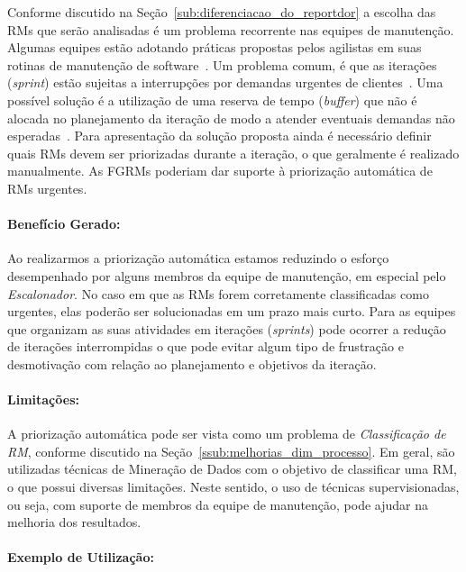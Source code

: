 Conforme discutido na Seção~\ref{sub:diferenciacao_do_reportdor} a escolha das
RMs que serão analisadas é um problema recorrente nas equipes de manutenção.
Algumas equipes estão adotando práticas propostas pelos agilistas em suas
rotinas de manutenção de software~\cite{svensson2005introducing}. Um problema
comum, é que as iterações (\textit{sprint}) estão sujeitas a interrupções por
demandas urgentes de clientes~\cite{bennett2000software}. Uma possível solução
é a utilização de uma reserva de tempo (\textit{buffer}) que não é alocada no
planejamento da iteração de modo a atender eventuais demandas não
esperadas~\cite{schwaber2002agile}. Para apresentação da solução proposta ainda
é necessário definir quais RMs devem ser priorizadas durante a iteração, o que
geralmente é realizado manualmente. As FGRMs poderiam dar suporte à priorização
automática de RMs urgentes.

\paragraph{Benefício Gerado:}\label{par:papéis_afetados_s07}

Ao realizarmos a priorização automática estamos reduzindo o esforço
desempenhado por alguns membros da equipe de manutenção, em especial pelo
\textit{Escalonador}. No caso em que as RMs forem corretamente classificadas
como urgentes, elas poderão ser solucionadas em um prazo mais curto. Para as
equipes que organizam as suas atividades em iterações (\textit{sprints}) pode
ocorrer a redução de iterações interrompidas o que pode evitar algum tipo de
frustração e desmotivação com relação ao planejamento e objetivos da iteração.

\paragraph{Limitações:}
\label{par:limitacoes_s07}

A priorização automática pode ser vista como um problema de
\textit{Classificação de RM}, conforme discutido na
Seção~\ref{ssub:melhorias_dim_processo}. Em geral, são utilizadas técnicas de
Mineração de Dados com o objetivo de classificar uma RM, o que possui diversas
limitações. Neste sentido, o uso de técnicas supervisionadas, ou seja, com
suporte de membros da equipe de manutenção, pode ajudar na melhoria dos
resultados.

\paragraph{Exemplo de Utilização:}
\label{par:exemplo_de_utilização_s07}


